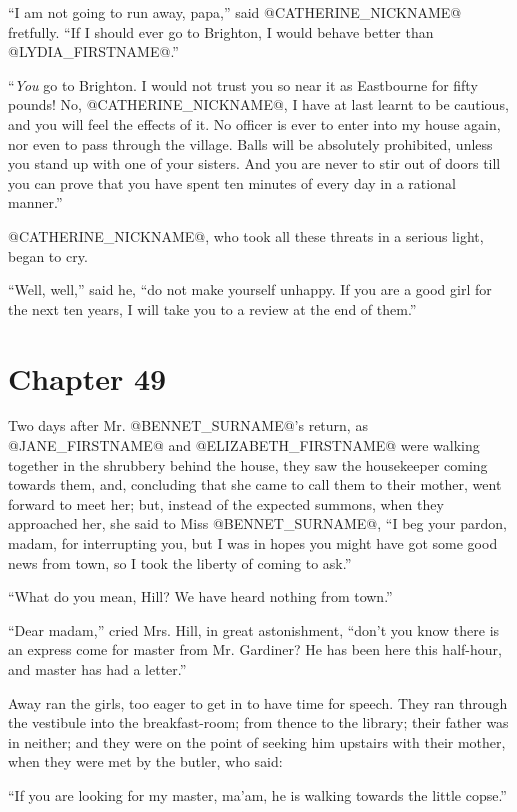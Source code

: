 ``I am not going to run away, papa,'' said @CATHERINE_NICKNAME@ fretfully. ``If I should
ever go to Brighton, I would behave better than @LYDIA_FIRSTNAME@.''

``\textit{You} go to Brighton. I would not trust you so near it as Eastbourne
for fifty pounds! No, @CATHERINE_NICKNAME@, I have at last learnt to be cautious, and
you will feel the effects of it. No officer is ever to enter into
my house again, nor even to pass through the village. Balls will be
absolutely prohibited, unless you stand up with one of your sisters.
And you are never to stir out of doors till you can prove that you have
spent ten minutes of every day in a rational manner.''

@CATHERINE_NICKNAME@, who took all these threats in a serious light, began to cry.

``Well, well,'' said he, ``do not make yourself unhappy. If you are a good
girl for the next ten years, I will take you to a review at the end of
them.''



\chapter*{Chapter 49}


Two days after Mr. @BENNET_SURNAME@'s return, as @JANE_FIRSTNAME@ and @ELIZABETH_FIRSTNAME@ were walking
together in the shrubbery behind the house, they saw the housekeeper
coming towards them, and, concluding that she came to call them to their
mother, went forward to meet her; but, instead of the expected summons,
when they approached her, she said to Miss @BENNET_SURNAME@, ``I beg your pardon,
madam, for interrupting you, but I was in hopes you might have got some
good news from town, so I took the liberty of coming to ask.''

``What do you mean, Hill? We have heard nothing from town.''

``Dear madam,'' cried Mrs. Hill, in great astonishment, ``don't you know
there is an express come for master from Mr. Gardiner? He has been here
this half-hour, and master has had a letter.''

Away ran the girls, too eager to get in to have time for speech. They
ran through the vestibule into the breakfast-room; from thence to the
library; their father was in neither; and they were on the point of
seeking him upstairs with their mother, when they were met by the
butler, who said:

``If you are looking for my master, ma'am, he is walking towards the
little copse.''

